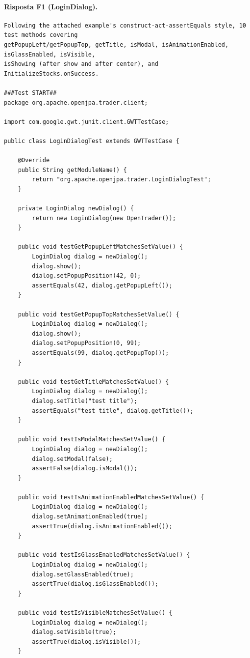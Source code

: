 \paragraph*{Risposta F1 (LoginDialog).}
\label{risposta:ld-f1}
\begin{lstlisting}
Following the attached example's construct-act-assertEquals style, 10 test methods covering
getPopupLeft/getPopupTop, getTitle, isModal, isAnimationEnabled, isGlassEnabled, isVisible,
isShowing (after show and after center), and InitializeStocks.onSuccess.

###Test START##
package org.apache.openjpa.trader.client;

import com.google.gwt.junit.client.GWTTestCase;

public class LoginDialogTest extends GWTTestCase {

    @Override
    public String getModuleName() {
        return "org.apache.openjpa.trader.LoginDialogTest";
    }

    private LoginDialog newDialog() {
        return new LoginDialog(new OpenTrader());
    }

    public void testGetPopupLeftMatchesSetValue() {
        LoginDialog dialog = newDialog();
        dialog.show();
        dialog.setPopupPosition(42, 0);
        assertEquals(42, dialog.getPopupLeft());
    }

    public void testGetPopupTopMatchesSetValue() {
        LoginDialog dialog = newDialog();
        dialog.show();
        dialog.setPopupPosition(0, 99);
        assertEquals(99, dialog.getPopupTop());
    }

    public void testGetTitleMatchesSetValue() {
        LoginDialog dialog = newDialog();
        dialog.setTitle("test title");
        assertEquals("test title", dialog.getTitle());
    }

    public void testIsModalMatchesSetValue() {
        LoginDialog dialog = newDialog();
        dialog.setModal(false);
        assertFalse(dialog.isModal());
    }

    public void testIsAnimationEnabledMatchesSetValue() {
        LoginDialog dialog = newDialog();
        dialog.setAnimationEnabled(true);
        assertTrue(dialog.isAnimationEnabled());
    }

    public void testIsGlassEnabledMatchesSetValue() {
        LoginDialog dialog = newDialog();
        dialog.setGlassEnabled(true);
        assertTrue(dialog.isGlassEnabled());
    }

    public void testIsVisibleMatchesSetValue() {
        LoginDialog dialog = newDialog();
        dialog.setVisible(true);
        assertTrue(dialog.isVisible());
    }


\end{lstlisting}
